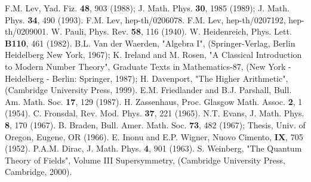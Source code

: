 \documentclass[a4paper,12pt]{article}%
\begin{document}
\begin{thebibliography}{99}
 F.M. Lev, Yad. Fiz. {\bf 48}, 903 (1988); 
J. Math. Phys. {\bf 30}, 1985 (1989); J. Math. Phys. {\bf 34}, 
490 (1993).
 F.M. Lev, hep-th/0206078.
 F.M. Lev, hep-th/0207192, hep-th/0209001.
 W. Pauli, Phys. Rev. {\bf 58}, 116 (1940).
 W. Heidenreich, Phys. Lett. 
{\bf B110}, 461 (1982).
 B.L. Van der Waerden, "Algebra I", 
(Springer-Verlag, Berlin Heidelberg New York, 1967);
K. Ireland and  M. Rosen, "A Classical 
Introduction to Modern Number Theory", Graduate Texts in 
Mathematics-87, (New  York  - Heidelberg - Berlin: Springer, 1987); 
H. Davenport, "The Higher Arithmetic", 
(Cambridge University Press, 1999).
 E.M. Friedlander and B.J. Parshall, Bull. Am.
Math. Soc. {\bf 17}, 129 (1987).
 H. Zassenhaus, Proc. Glasgow Math. Assoc. 
{\bf 2}, 1 (1954).
 C. Fronsdal, Rev. Mod. Phys. 
{\bf 37}, 221 (1965).
 N.T. Evans, J. Math. Phys. 
{\bf 8}, 170 (1967). 
 B. Braden, Bull. Amer. Math. Soc. 
{\bf 73}, 482 (1967);
Thesis, Univ. of Oregon, Eugene, OR (1966).
 E. Inonu and E.P. Wigner, Nuovo Cimento, 
{\bf IX}, 705 (1952).
 P.A.M. Dirac, J. Math. Phys. 
{\bf 4}, 901 (1963).
 S. Weinberg, "The Quantum 
Theory of Fields", Volume III Supersymmetry, (Cambridge 
University Press, Cambridge, 2000).
\end{thebibliography}
\end{document}
